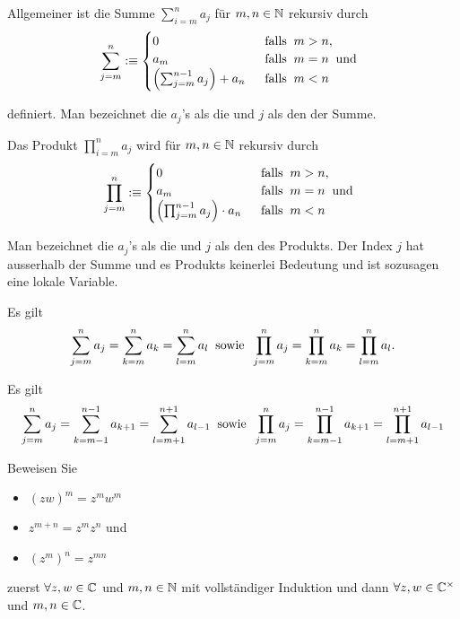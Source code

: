 \begin{mydef-non}
  Allgemeiner ist die Summe $\sum_{i=m}^{n} a_j$ für $m,n \in \mathbb{N}$ rekursiv durch
\[
  \sum_{j=m}^{n}
  :\equiv
  \begin{cases}
    0 & \;\; \text{falls}\;\; m>n, \\
    a_m & \;\; \text{falls}\;\; m = n \;\; \text{und}\;\; \\
    \left(\sum_{j=m}^{n-1}a_j\right) + a_n & \;\; \text{falls}\;\; m < n
  \end{cases}
\]

definiert. Man bezeichnet die $a_j$'s als die  und $j$ als den  der Summe.

Das Produkt $\prod_{i=m}^{n} a_j$ wird für $m,n \in \mathbb{N}$ rekursiv durch
\[
\prod_{j=m}^{n}
:\equiv
\begin{cases}
  0 & \;\; \text{falls}\;\; m>n, \\
  a_m & \;\; \text{falls}\;\; m = n \;\; \text{und}\;\; \\
  \left(\prod_{j=m}^{n-1}a_j\right) \cdot a_n & \;\; \text{falls}\;\; m < n
\end{cases}
\]

Man bezeichnet die $a_j$'s als die  und $j$ als den  des Produkts. Der Index $j$ hat ausserhalb der Summe und es Produkts keinerlei Bedeutung und ist sozusagen eine lokale Variable.
\end{mydef-non}

Es gilt
\[
  \sum_{j=m}^{n} a_j = \sum_{k=m}^{n} a_k = \sum_{l=m}^{n} a_l \;\; \text{sowie}\;\;
  \prod_{j=m}^{n} a_j = \prod_{k=m}^{n} a_k = \prod_{l=m}^{n} a_l.
\]

\begin{ex}[Indexverschiebung]
  Es gilt
  \[
  \sum_{j=m}^{n} a_j = \sum_{k=m-1}^{n-1}a_{k+1} = \sum_{l=m+1}^{n+1}a_{l-1}
  \;\; \text{sowie}\;\;
  \prod_{j=m}^{n} a_j = \prod_{k=m-1}^{n-1}a_{k+1} = \prod_{l=m+1}^{n+1}a_{l-1}
  \]
\end{ex}

\begin{ex}[Potenzregeln]
  Beweisen Sie
  \begin{itemize}
    \item $(zw)^m = z^m w^m$
    \item $z^{m+n} = z^m z^n$ und
    \item $(z^m)^n = z^{mn}$
  \end{itemize}

  zuerst $\forall z,w \in \mathbb{C}$ und $m,n \in \mathbb{N}$ mit vollständiger Induktion und dann $\forall z,w \in \mathbb{C}^\times$ und $m,n \in \mathbb{C}$.
\end{ex}

